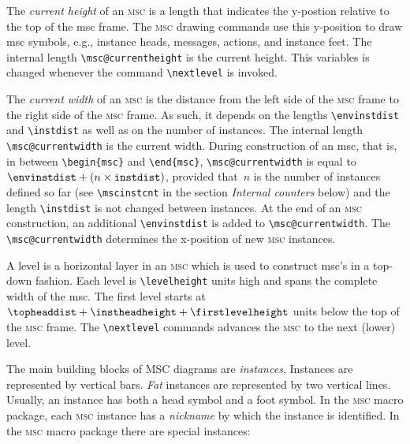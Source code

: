 \documentclass[a4paper]{article}
\newcommand{\acro}[1]{{\scshape\lowercase{#1}}}
\newcommand\MSC{\acro{MSC}}
\newcommand{\mscpack}{\MSC{} macro package}
\newenvironment{defs}{%
  \begin{list}{}%
              {\setlength{\labelwidth}{0pt}%
               \setlength{\labelsep}{1em}%
               \setlength{\leftmargin}{1em}%
               \setlength{\parsep}{1ex}%
               \setlength{\listparindent}{0pt}%
               \setlength{\rightmargin}{0pt}%
               \renewcommand{\makelabel}[1]{##1}%
               \raggedright%
              }%
  }{%
  \end{list}}
\begin{document}
\begin{defs}
\item[\emph{current height}] The \emph{current height} of an \MSC{} is a
length that indicates the y-postion relative to the top of the msc
frame. The \MSC{} drawing commands use this y-position to draw msc
symbols, e.g., instance heads, messages, actions, and instance
feet. The internal length \verb|\msc@currentheight| is the current
height. This variables is changed whenever the command
\verb|\nextlevel| is invoked.

\item[\emph{current width}] The \emph{current width} of an \MSC{} is the
distance from the left side of the \MSC{} frame to the right side of the
\MSC{} frame. As such, it depends on the lengths \verb|\envinstdist| and
\verb|\instdist| as well as on the number of instances. The internal
length \verb|\msc@currentwidth| is the current width. During
construction of an msc, that is, in between \verb|\begin{msc}| and
\verb|\end{msc}|, \verb|\msc@currentwidth| is equal to
$\verb|\envinstdist| + (n \times \verb|instdist|)$, provided that~$n$ is
the number of instances defined so far (see \verb|\mscinstcnt| in the
section \emph{Internal counters} below) and the length
\verb|\instdist| is not changed between instances. At the end of an
\MSC{} construction, an additional \verb|\envinstdist| is added to
\verb|\msc@currentwidth|. The \verb|\msc@currentwidth| determines the
x-position of new \MSC{} instances.

\item[\emph{level}] A level is a horizontal layer in an \MSC{} which is
used to construct msc's in a top-down fashion. Each level is
\verb|\levelheight| units high and spans the complete width of the
msc. The first level starts at $\verb|\topheaddist| +
\verb|\instheadheight| + \verb|\firstlevelheight|$ units below the top
of the \MSC{} frame. The \verb|\nextlevel| commands advances the \MSC{} to
the next (lower) level.

\item[\emph{\MSC{} instance}] The main building blocks of MSC diagrams
are \emph{instances}. Instances are represented by vertical
bars. \emph{Fat} instances are represented by two vertical
lines. Usually, an instance has both a head symbol and a foot symbol.
In the \mscpack, each \MSC{} instance has a \emph{nickname} by which
the instance is identified.  In the \mscpack{} there are special
instances:


\end{defs}
\end{document}
